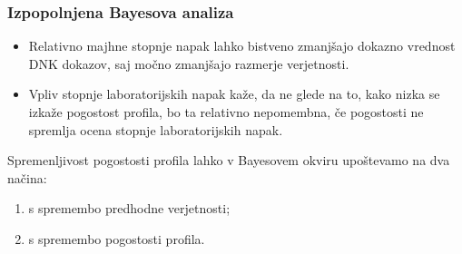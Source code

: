 \documentclass{beamer}
\begin{document}
 
\begin{frame}
    \frametitle{Izpopolnjena Bayesova analiza}
    \begin{itemize}
        \item Relativno majhne stopnje napak lahko bistveno zmanjšajo dokazno vrednost DNK dokazov, saj močno zmanjšajo razmerje verjetnosti.
        \item Vpliv stopnje laboratorijskih napak kaže, da ne glede na to, kako nizka se izkaže pogostost profila, bo ta relativno nepomembna, če pogostosti ne spremlja ocena stopnje laboratorijskih napak.
    \end{itemize} \vspace{3mm}
    Spremenljivost pogostosti profila lahko v Bayesovem okviru upoštevamo na dva načina: 
    \begin{enumerate}
        \item s spremembo predhodne verjetnosti;
        \item s spremembo pogostosti profila.
    \end{enumerate}
\end{frame}

\begin{frame}
    \frametitle{}
\end{frame}
\end{document}
